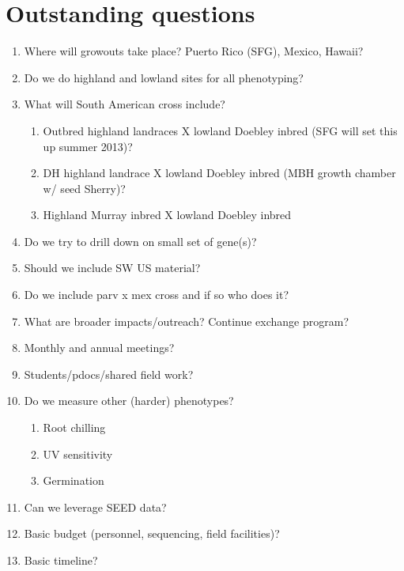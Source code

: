\documentclass[]{article}
\begin{document}
\section*{Outstanding questions}
\begin{enumerate}
	\item Where will growouts take place?  Puerto Rico (SFG), Mexico, Hawaii?
	\item Do we do highland and lowland sites for all phenotyping?
	\item What will South American cross include?  
	\begin{enumerate}
		\item Outbred highland landraces X lowland Doebley inbred (SFG will set this up summer 2013)? 
		\item DH highland landrace X lowland Doebley inbred (MBH growth chamber w/ seed Sherry)?
		\item Highland Murray inbred X lowland Doebley inbred
	\end{enumerate}
	\item Do we try to drill down on small set of gene(s)?
	\item Should we include SW US material?
	\item Do we include parv x mex cross and if so who does it?
	\item What are broader impacts/outreach? Continue exchange program?
	\item Monthly and annual meetings?
	\item Students/pdocs/shared field work?
	\item Do we measure other (harder) phenotypes?
		\begin{enumerate}
		\item Root chilling
		\item UV sensitivity
		\item Germination
		\end{enumerate}
	\item Can we leverage SEED data?
	\item Basic budget (personnel, sequencing, field facilities)?
	\item Basic timeline?

\end{enumerate}
\end{document}
